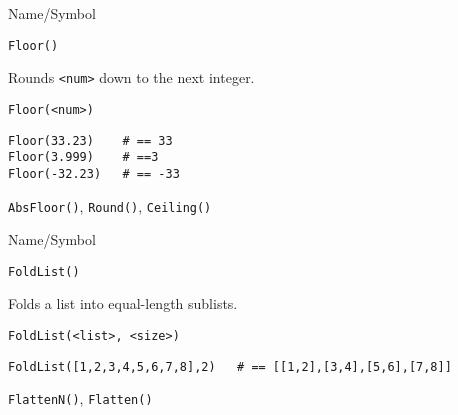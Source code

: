 \rl




\begin{desc}{Name/Symbol}
\item[Name/Symbol]	\verb+Floor()+

\item[Description]	Rounds \verb+<num>+ down to the next integer.

\item[Usage]
\begin{verbatim}
Floor(<num>)
\end{verbatim}

\item[Example]
\begin{verbatim}
Floor(33.23)	# == 33
Floor(3.999)  	# ==3
Floor(-32.23) 	# == -33
\end{verbatim}
 
\item[See Also]	\verb+AbsFloor()+, \verb+Round()+, \verb+Ceiling()+
\end{desc}

\rl


\begin{desc}{Name/Symbol}
\item[Name/Symbol]	\verb+FoldList()+

\item[Description]	Folds a list into equal-length sublists.

\item[Usage]
\begin{verbatim}
FoldList(<list>, <size>)
\end{verbatim}

\item[Example]
\begin{verbatim}
FoldList([1,2,3,4,5,6,7,8],2)	# == [[1,2],[3,4],[5,6],[7,8]]
\end{verbatim}
 
\item[See Also]	\verb+FlattenN()+, \verb+Flatten()+
\end{desc}

\rl



